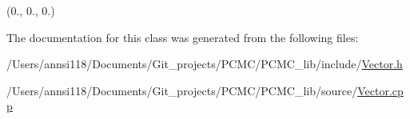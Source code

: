 (0., 0., 0.) 



The documentation for this class was generated from the following files\+:\begin{DoxyCompactItemize}
\item 
/\+Users/annsi118/\+Documents/\+Git\+\_\+projects/\+P\+C\+M\+C/\+P\+C\+M\+C\+\_\+lib/include/\hyperlink{_vector_8h}{Vector.\+h}\item 
/\+Users/annsi118/\+Documents/\+Git\+\_\+projects/\+P\+C\+M\+C/\+P\+C\+M\+C\+\_\+lib/source/\hyperlink{_vector_8cpp}{Vector.\+cpp}\end{DoxyCompactItemize}
